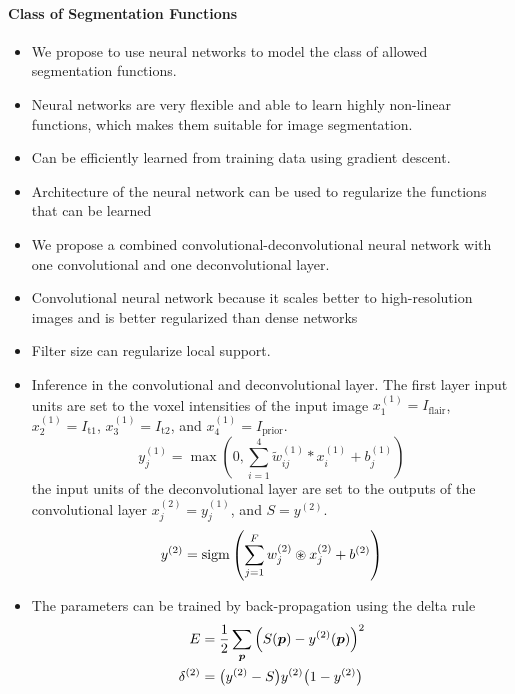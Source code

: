 \paragraph{Class of Segmentation Functions}
\begin{itemize}
\item We propose to use neural networks to model the class of allowed
segmentation functions.
\item Neural networks are very flexible and able to learn highly non-linear
functions, which makes them suitable for image segmentation.
\item Can be efficiently learned from training data using gradient descent.
\item Architecture of the neural network can be used to regularize the functions
that can be learned
\item We propose a combined convolutional-deconvolutional neural network with
one convolutional and one deconvolutional layer.
\item Convolutional neural network because it scales better to high-resolution
images and is better regularized than dense networks
\item Filter size can regularize local support.
\item Inference in the convolutional and deconvolutional layer. The first
layer input units are set to the voxel intensities of the input image
$x^{(1)}_1 = I_\text{flair}$, $x^{(1)}_2 = I_\text{t1}$,
$x^{(1)}_3 = I_\text{t2}$, and $x^{(1)}_4 = I_\text{prior}$.
\begin{equation}
y^{(1)}_j = \max \left(0, \sum_{i=1}^{4}\tilde{w}^{(1)}_{ij}*x^{(1)}_i +
b^{(1)}_j\right)
\end{equation}
the input units of the deconvolutional layer are set to the outputs
of the convolutional layer $x^{(2)}_j = y^{(1)}_j$, and $S = y^{(2)}$.
\begin{equation}
y^{(2)} = \operatorname{sigm}\left(\sum_{j=1}^Fw^{(2)}_{j}\circledast x^{(2)}_j +
b^{(2)}\right)
\end{equation}
\item The parameters can be trained by back-propagation using the delta rule
\begin{align}
E &= \frac{1}{2}\sum_{\vect{p}}\left(S(\vect{p}) - y^{(2)}(\vect{p})\right)^2
\\
\delta^{(2)} &= \big(y^{(2)} -S\big)y^{(2)}\big(1-y^{(2)}\big)
\end{align}
\begin{align}

\end{align}
\end{itemize}
